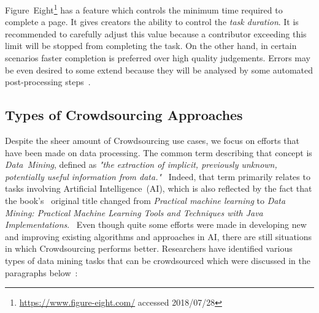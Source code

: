 Figure~Eight\footnote{\url{https://www.figure-eight.com/} accessed 2018/07/28} has a feature which controls the minimum time required to complete a page. It gives creators the ability to control the \emph{task duration}. It is recommended to carefully adjust this value because a contributor exceeding this limit will be stopped from completing the task. On the other hand, in certain scenarios faster completion is preferred over high quality judgements. Errors may be even desired to some extend because they will be analysed by some automated post-processing steps~\cite{krishna2016}. 

\subsection{Types of Crowdsourcing Approaches}
Despite the sheer amount of Crowdsourcing use cases, we focus on efforts that have been made on data processing. The common term describing that concept is \emph{Data~Mining}, defined as \emph{"the extraction of implicit, previously unknown, potentially useful information from data."}~\cite{witten2016}
Indeed, that term primarily relates to tasks involving Artificial Intelligence~(AI), which is also reflected by the fact that the book's~\cite{witten2000} original title changed from \emph{Practical machine learning} to \emph{Data Mining: Practical Machine Learning Tools and Techniques with Java Implementations}.~\cite{bouckaert2010} Even though quite some efforts were made in developing new and improving existing algorithms and approaches in AI, there are still situations in which Crowdsourcing performs better. Researchers have identified various types of data mining tasks that can be crowdsourced which were discussed in the paragraphs below~\cite{xintong2014, barbier2012, sabou2012}:

